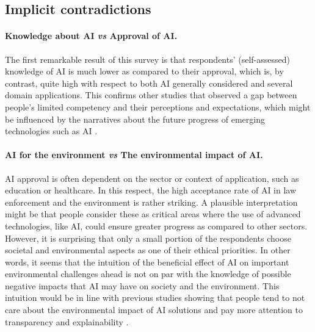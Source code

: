 \documentclass{article}
\begin{document}
\subsection{Implicit contradictions}

\paragraph{\textbf{Knowledge about AI \emph{vs} Approval of AI}.}
The first remarkable result of this survey is that respondents' (self-assessed) knowledge of AI is much lower as compared to their approval, which is, by contrast, quite high with respect to both AI generally considered and several domain applications. This confirms other studies that observed a gap between people's limited competency and their perceptions and expectations, which might be influenced by the narratives about the future progress of emerging technologies such as AI \cite{TRS}.

\paragraph{\textbf{AI for the environment \emph{vs} The environmental impact of AI}.}
AI approval is often dependent on the sector or context of application, such as education or healthcare. In this respect, the high acceptance rate of AI in law enforcement and the environment is rather striking. A plausible interpretation might be that people consider these as critical areas where the use of advanced technologies, like AI, could ensure greater progress as compared to other sectors. However, it is surprising that only a small portion of the respondents choose societal and environmental aspects as one of their ethical priorities. In other words, it seems that the intuition of the beneficial effect of AI on important environmental challenges ahead is not on par with the knowledge of possible negative impacts that AI may have on society and the environment. This intuition would be in line with previous studies showing that people tend to not care about the environmental impact of AI solutions and pay more attention to transparency and explainability \cite{konig2022consumers}.
\end{document}
